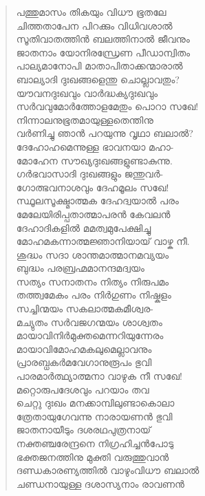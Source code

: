 \begin{verse}
പത്തുമാസം തികയും വിധൗ ഭൂതലേ\\
ചിത്തതാപേന പിറക്കും വിധിവശാല്‍\\
സൂതിവാതത്തിന്‍ ബലത്തിനാല്‍ ജീവനും\\
ജാതനാം യോനിരന്ധ്രേണ പീഡാന്വിതം\\
പാല്യമാനോപി മാതാപിതാക്കന്മാരാല്‍\\
ബാല്യാദി ദുഃഖങ്ങളെന്തു ചൊല്ലാവതും?\\
യൗവനദുഃഖവും വാര്‍ദ്ധക്യദുഃഖവും\\
സര്‍വവുമോര്‍ത്തോളമേതും പൊറാ സഖേ!\\
നിന്നാലനുഭൂതമായുള്ളതെന്തിനു\\
വര്‍ണിച്ചു ഞാന്‍ പറയുന്നു വൃഥാ ബലാല്‍?\\
ദേഹോഹമെന്നുള്ള ഭാവനയാ മഹാ-\\
മോഹേന സൗഖ്യദുഃഖങ്ങളുണ്ടാകുന്നു.\\
ഗര്‍ഭവാസാദി ദുഃഖങ്ങളും ജന്തുവര്‍-\\
ഗോത്ഭവനാശവും ദേഹമൂലം സഖേ!\\
സ്ഥൂലസൂക്ഷ്മാത്മക ദേഹദ്വയാല്‍ പരം\\
മേലേയിരിപ്പതാത്മാപരന്‍ കേവലന്‍\\
ദേഹാദികളില്‍ മമത്വമുപേക്ഷിച്ചു\\
മോഹമകന്നാത്മജ്ഞാനിയായ് വാഴ്ക നീ.\\
ശുദ്ധം സദാ ശാന്തമാത്മാനമവ്യയം\\
ബുദ്ധം പരബ്രഹ്മമാനന്ദമദ്വയം\\
സത്യം സനാതനം നിത്യം നിരുപമം\\
തത്ത്വമേകം പരം നിര്‍ഗുണം നിഷ്കളം\\
സച്ചിന്മയം സകലാത്മകമീശ്വര-\\
മച്യുതം സര്‍വജഗന്മയം ശാശ്വതം\\
മായാവിനിര്‍മുക്തമെന്നറിയുന്നേരം\\
മായാവിമോഹമകലുമെല്ലാവനും\\
പ്രാരബ്ധകര്‍മവേഗാനുരൂപം ഭുവി\\
പാരമാര്‍ത്ഥ്യാത്മനാ വാഴുക നീ സഖേ!\\
മറ്റൊരുപദേശവും പറയാം തവ\\
ചെറ്റു ദുഃഖം മനക്കാമ്പിലുണ്ടാകൊലാ\\
ത്രേതായുഗേവന്നു നാരായണന്‍ ഭുവി\\
ജാതനായീടും ദശരഥപുത്രനായ്\\
നക്തഞ്ചരേന്ദ്രനെ നിഗ്രഹിച്ചന്‍പോടു\\
ഭക്തജനത്തിനു മുക്തി വരുത്തുവാന്‍\\
ദണ്ഡകാരണ്യത്തില്‍ വാഴുംവിധൗ ബലാല്‍\\
ചണ്ഡനായുള്ള ദശാസ്യനാം രാവണന്‍\\

\end{verse}

